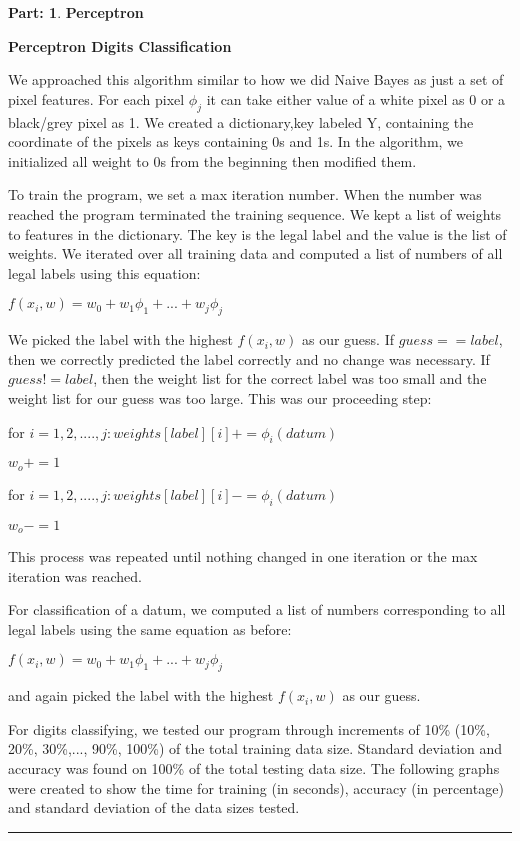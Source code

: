 \documentclass{article}
\theoremstyle{definition}
\def\fline{\rule{0.75\linewidth}{0.5pt}}
\newcommand{\finishline}{\begin{center}\fline\end{center}}
\newtheorem*{solution*}{Part: }
\newenvironment{solution}{\begin{solution*}}{{\finishline} \end{solution*}}
\begin{document}
\begin{solution}
\item \textbf{Perceptron}
\item \textbf{Perceptron Digits Classification}
\item We approached this algorithm similar to how we did Naive Bayes as just a set of pixel features. For each pixel $\phi_j$ it can take either value of a white pixel as 0 or a black/grey pixel as 1. We created a dictionary,key labeled Y, containing the coordinate of the pixels as keys containing 0s and 1s. In the algorithm, we initialized all weight to 0s from the beginning then modified them.
\item To train the program, we set a max iteration number. When the number was reached the program terminated the training sequence. We kept a list of weights to features in the dictionary. The key is the legal label and the value is the list of weights. We iterated over all training data and computed a list of numbers of all legal labels using this equation:
\item $f(x_i, w) = w_0 + w_1\phi_1 + ... + w_j\phi_j$
\item We picked the label with the highest $f(x_i, w)$ as our guess. If $guess == label$, then we correctly predicted the label correctly and no change was necessary. If $guess != label$, then the weight list for the correct label was too small and the weight list for our guess was too large. This was our proceeding step:
\item for $i = 1,2,....,j : weights[label][i] += \phi_i(datum)$
\item $w_o += 1$
\item for $i = 1,2,....,j : weights[label][i] -= \phi_i(datum)$
\item $w_o -= 1$
\item This process was repeated until nothing changed in one iteration or the max iteration was reached.

\item For classification of a datum, we computed a list of numbers corresponding to all legal labels using the same equation as before:
\item $f(x_i, w) = w_0 + w_1\phi_1 + ... + w_j\phi_j$
\item and again picked the label with the highest $f(x_i, w)$ as our guess.

\item For digits classifying, we tested our program through increments of 10\% (10\%, 20\%, 30\%,..., 90\%, 100\%) of the total training data size. Standard deviation and accuracy was found on 100\% of the total testing data size. The following graphs were created to show the time for training (in seconds), accuracy (in percentage) and standard deviation of the data sizes tested.


\end{solution}
\end{document}
